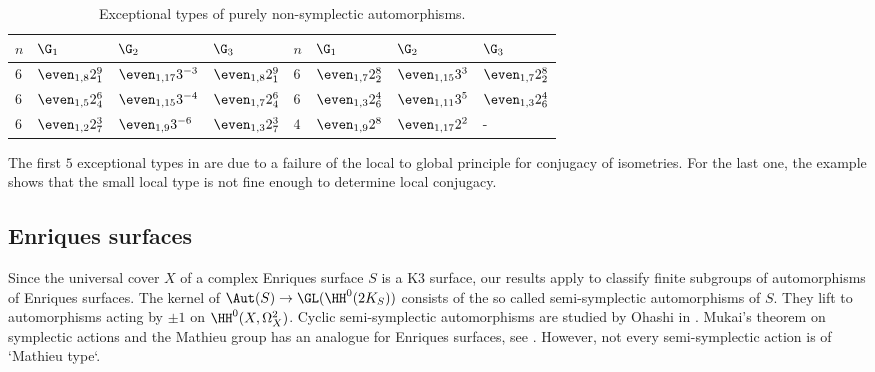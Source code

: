  \begin{table}[h]
  \caption{Exceptional types of purely non-symplectic automorphisms.}\label{exceptionaltype}
 \renewcommand{\arraystretch}{1.2}
 \begin{tabular}{llll|llll}
 \toprule
 $n$ & $\G_1$ & $\G_2$ & $\G_3$
 &$n$ & $\G_1$ & $\G_2$ & $\G_3$\\
 \hline
 $6$ & $\even_{1,8}2^9_1$& $\even_{1,17}3^{-3}$& $\even_{1,8}2^9_1$ &
 $6$ & $\even_{1,7}2^8_2$& $\even_{1,15}3^{3}$ & $\even_{1,7}2^8_2$\\
 $6$ & $\even_{1,5}2^6_4$& $\even_{1,15}3^{-4}$& $\even_{1,7}2^6_4$&
 $6$ & $\even_{1,3}2^4_6$& $\even_{1,11}3^{5}$ & $\even_{1,3}2^4_6$\\
 $6$ & $\even_{1,2}2^3_7$& $\even_{1,9}3^{-6}$ & $\even_{1,3}2^3_7$ &
 $4$ & $\even_{1,9}2^8$ & $\even_{1,17}2^2$& - \\
 \bottomrule
 \end{tabular}
 \end{table}

 \begin{remark}
The first $5$ exceptional types in  are due to a failure of the local to global principle for conjugacy of isometries. For the last one, the example shows that the small local type is not fine enough to determine local conjugacy.
\end{remark}

\subsection*{Enriques surfaces}
Since the universal cover $X$ of a complex Enriques surface $S$ is a K3 surface, our results apply to classify finite subgroups of automorphisms of Enriques surfaces. The kernel of $\Aut(S) \to \GL(\HH^0(2K_S))$ consists of the so called semi-symplectic automorphisms of $S$. They lift to automorphisms acting by $\pm 1$ on $\HH^0(X,\Omega_X^2)$.
Cyclic semi-symplectic automorphisms are studied by Ohashi in
\cite{ohashi2015}. Mukai's theorem on symplectic actions and the Mathieu group has an analogue for Enriques surfaces,
see \cite{mukai-ohashi2015}. However, not every semi-symplectic action is of `Mathieu type`.

